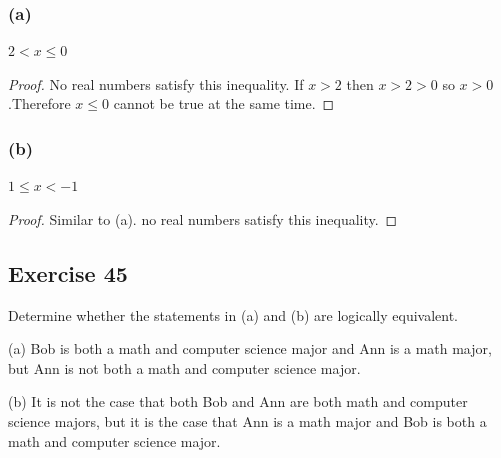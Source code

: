 \documentclass[14pt]{extarticle}
\begin{document}
\subsubsection{(a)} $2 < x \leq 0$
\begin{proof} No real numbers satisfy this inequality. If $x > 2$ then $x > 2 >
0$ so $x > 0$.Therefore $x \leq 0$ cannot be true at the same time. \end{proof}

\subsubsection{(b)} $1 \leq x < -1$
\begin{proof} Similar to (a). no real numbers satisfy this inequality.
\end{proof}

\subsection{Exercise 45} Determine whether the statements in (a) and (b) are
logically equivalent.

(a) Bob is both a math and computer science major and Ann is a math major, but
Ann is not both a math and computer science major.

(b) It is not the case that both Bob and Ann are both math and computer science
majors, but it is the case that Ann is a math major and Bob is both a math and
computer science major.
\end{document}

